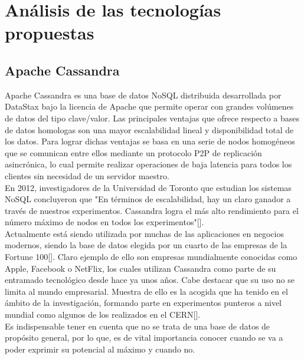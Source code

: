 
\pagestyle{fancy}

\chapter{Análisis de las tecnologías propuestas}
\label{analisis_tecnologias}

\section{Apache Cassandra}

Apache Cassandra es una base de datos NoSQL distribuida desarrollada por DataStax bajo la licencia de Apache que permite operar con grandes volúmenes de datos del tipo clave/valor. Las principales ventajas que ofrece respecto a bases de datos homologas son una mayor escalabilidad lineal y disponibilidad total de los datos. Para lograr dichas ventajas se basa en una serie de nodos homogéneos que se comunican entre ellos mediante un protocolo P2P de replicación asincrónica, lo cual permite realizar operaciones de baja latencia para todos los clientes sin necesidad de un servidor maestro.\\

En 2012, investigadores de la Universidad de Toronto que estudian los sistemas NoSQL concluyeron que "En términos de escalabilidad, hay un claro ganador a través de nuestros experimentos. Cassandra logra el más alto rendimiento para el número máximo de nodos en todos los experimentos"[].\\

Actualmente está siendo utilizada por muchas de las aplicaciones en negocios modernos, siendo la base de datos elegida por un cuarto de las empresas de la Fortune 100[]. Claro ejemplo de ello son empresas mundialmente conocidas como Apple, Facebook o NetFlix, los cuales utilizan Cassandra como parte de su entramado tecnológico desde hace ya unos años. Cabe destacar que su uso no se limita al mundo empresarial. Muestra de ello es la acogida que ha tenido en el ámbito de la investigación, formando parte en experimentos punteros a nivel mundial como algunos de los realizados en el CERN[].\\

Es indispensable tener en cuenta que no se trata de una base de datos de propósito general, por lo que, es de vital importancia conocer cuando se va a poder exprimir su potencial al máximo y cuando no.\\

